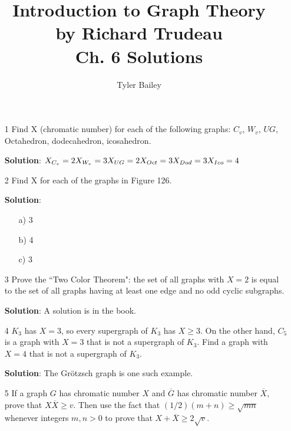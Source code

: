 \documentclass{article}
\begin{document}
	\title{%
  	Introduction to Graph Theory \\
  		\large by Richard Trudeau \\
   		Ch. 6 Solutions}
   		\author{Tyler Bailey}
	\maketitle

	\begin{enumerate}

		\item[1] Find X (chromatic number) for each of the following graphs: $C_v$, $W_v$, $UG$, Octahedron, dodecahedron, icosahedron.
		
		\textbf{Solution}: 
		$\\
		X_{C_v} = 2 \\ 		
		X_{W_v} = 3 \\
		X_{UG} = 2 \\
		X_{Oct} = 3 \\
		X_{Dod} = 3 \\
		X_{Ico} = 4 \\
		$
		
		\item[2] Find X for each of the graphs in Figure 126.
		
		\textbf{Solution}:
			\begin{enumerate}
				\item[a)] 3
				\item[b)] 4
				\item[c)] 3
			\end{enumerate}
			
		\item[3] Prove the ``Two Color Theorem": the set of all graphs with $X = 2$ is equal to the set of all graphs having at least one edge and no odd cyclic subgraphs.
		
		\textbf{Solution}: A solution is in the book.
		
		\item[4] $K_3$ has $X = 3$, so every supergraph of $K_3$ has $X \geq 3$. On the other hand, $C_5$ is a graph with $X = 3$ that is not a supergraph of $K_3$. Find a graph with $X = 4$ that is not a supergraph of $K_3$.

		\textbf{Solution}: The Grötzsch graph is one such example.
		
		\item[5] If a graph $G$ has chromatic number $X$ and $\overline{G}$ has chromatic number $\overline{X}$, prove that $X\overline{X} \geq v$. Then use the fact that $(1/2)(m + n) \geq \sqrt{mn}$ whenever integers $m, n > 0$ to prove that $X + \overline{X} \geq 2\sqrt{v}$.
		

\end{enumerate}
\end{document}
